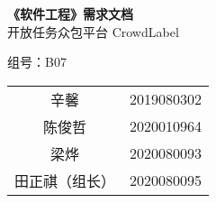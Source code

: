 \vspace*{\fill}
\begin{center}
    \Huge
    \textbf{《软件工程》需求文档}\\
    \vspace{2em}
    开放任务众包平台 CrowdLabel
    \normalsize

    \vspace{2em}
    组号：B07
    \vspace{2em}

    \begin{tabular}{cc}
        辛馨 & 2019080302 \\
        陈俊哲 & 2020010964 \\
        梁烨 & 2020080093 \\
        田正祺（组长）& 2020080095\\
    \end{tabular}

\end{center}
\vspace*{\fill}
\newpage

\tableofcontents

\newpage
{}